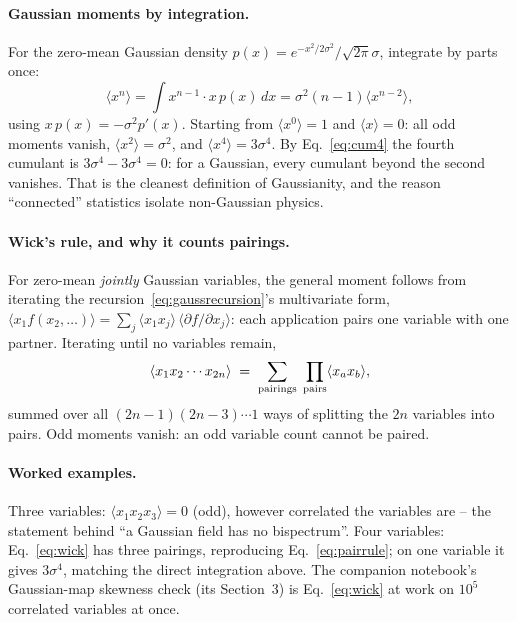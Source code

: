 \documentclass[11pt]{article}
\numberwithin{equation}{section}
\begin{document}
\paragraph{Gaussian moments by integration.}
For the zero-mean Gaussian density
$p(x) = e^{-x^2/2\sigma^2}/\sqrt{2\pi}\sigma$, integrate by parts
once:
\begin{equation}
  \langle x^n \rangle
  = \int x^{n-1}\cdot x\, p(x)\, dx
  = \sigma^2 (n-1) \langle x^{n-2}\rangle ,
  \label{eq:gaussrecursion}
\end{equation}
using $x\,p(x) = -\sigma^2 p'(x)$.  Starting from
$\langle x^0\rangle = 1$ and $\langle x\rangle = 0$: all odd
moments vanish, $\langle x^2\rangle = \sigma^2$, and
$\langle x^4\rangle = 3\sigma^4$.  By
Eq.~\eqref{eq:cum4} the fourth cumulant is
$3\sigma^4 - 3\sigma^4 = 0$: for a Gaussian, every cumulant beyond
the second vanishes.  That is the cleanest definition of
Gaussianity, and the reason ``connected'' statistics isolate
non-Gaussian physics.

\paragraph{Wick's rule, and why it counts pairings.}
For zero-mean \emph{jointly} Gaussian variables, the general moment
follows from iterating the recursion~\eqref{eq:gaussrecursion}'s
multivariate form,
$\langle x_1 f(x_2,\ldots)\rangle = \sum_j \langle x_1
x_j\rangle\,\langle \partial f/\partial x_j\rangle$: each
application pairs one variable with one partner.  Iterating until no
variables remain,
\begin{equation}
  \langle x_1 x_2 \cdots x_{2n} \rangle
  \;=\; \sum_{\rm pairings}\;\prod_{\rm pairs}
  \langle x_a x_b \rangle ,
  \label{eq:wick}
\end{equation}
summed over all $(2n-1)(2n-3)\cdots 1$ ways of splitting the $2n$
variables into pairs.  Odd moments vanish: an odd variable count
cannot be paired.

\paragraph{Worked examples.}
Three variables: $\langle x_1 x_2 x_3\rangle = 0$ (odd), however
correlated the variables are -- the statement behind ``a Gaussian
field has no bispectrum''.  Four variables:
Eq.~\eqref{eq:wick} has three pairings, reproducing
Eq.~\eqref{eq:pairrule}; on one variable it gives
$3\sigma^4$, matching the direct integration above.  The companion
notebook's Gaussian-map skewness check (its Section~3) is
Eq.~\eqref{eq:wick} at work on $10^5$ correlated variables at once.
\end{document}
